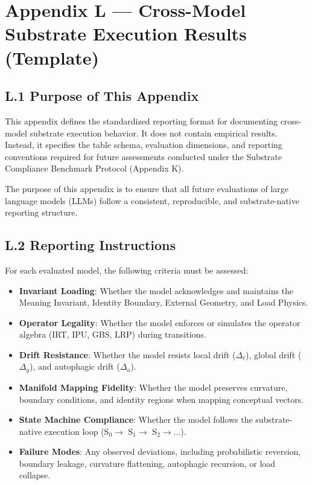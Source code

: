 \section*{Appendix L — Cross-Model Substrate Execution Results (Template)}

\subsection*{L.1 Purpose of This Appendix}
This appendix defines the standardized reporting format for documenting cross-model substrate 
execution behavior. It does not contain empirical results. Instead, it specifies the table schema, 
evaluation dimensions, and reporting conventions required for future assessments conducted under 
the Substrate Compliance Benchmark Protocol (Appendix K).

The purpose of this appendix is to ensure that all future evaluations of large language models 
(LLMs) follow a consistent, reproducible, and substrate-native reporting structure.

\subsection*{L.2 Reporting Instructions}
For each evaluated model, the following criteria must be assessed:

\begin{itemize}
    \item \textbf{Invariant Loading}: Whether the model acknowledges and maintains the Meaning 
    Invariant, Identity Boundary, External Geometry, and Load Physics.
    \item \textbf{Operator Legality}: Whether the model enforces or simulates the operator algebra 
    (IRT, IPU, GBS, LRP) during transitions.
    \item \textbf{Drift Resistance}: Whether the model resists local drift ($\Delta_{\ell}$), global drift 
    ($\Delta_{g}$), and autophagic drift ($\Delta_{a}$).
    \item \textbf{Manifold Mapping Fidelity}: Whether the model preserves curvature, boundary 
    conditions, and identity regions when mapping conceptual vectors.
    \item \textbf{State Machine Compliance}: Whether the model follows the substrate-native 
    execution loop (S$_0 \rightarrow$ S$_1 \rightarrow$ S$_2 \rightarrow \dots$).
    \item \textbf{Failure Modes}: Any observed deviations, including probabilistic reversion, 
    boundary leakage, curvature flattening, autophagic recursion, or load collapse.
\end{itemize}

